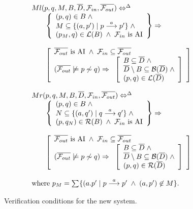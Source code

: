 \begin{figure}
\[\begin{array}{lll}
\multicolumn{3}{l}{Ml(p,q,M,B,\overline{D},{\cal F}_{in},\overline{{\cal F}_{out}}) \Leftrightarrow^{\Delta}}\\
&&\left\{
\begin{array}{l}
(p,q)\in B\;\wedge\\
M\subseteq\{(a,p')\mid p\der{a}p'\}\;\wedge\\
(p_M,q)\in{\cal L}(B)\;\wedge\;{\cal F}_{in} \mbox{ is AI}
\end{array}\right\}\Rightarrow\\
\\
&&\left[
\begin{array}{l}
\overline{{\cal F}_{out}}  \mbox{ is AI} \;\wedge\;{\cal F}_{in}\subseteq\overline{{\cal F}_{out}}\\
(\overline{{\cal F}_{out}}\not\models p\not\sim q)\Rightarrow\;\;
\left[
\begin{array}{l}
B\subseteq \overline{D}\; \wedge\\
\overline{D}\setminus B\subseteq {\cal B}(\overline{D})\;\wedge\\
(p,q)\in{\cal L}(\overline{D})
\end{array}
\right]
\end{array}
\right]\\
\\

\multicolumn{3}{l}{Mr(p,q,M,B,\overline{D},{\cal F}_{in},\overline{{\cal F}_{out}}) \Leftrightarrow^{\Delta}}\\
&&\left\{
\begin{array}{l}
(p,q)\in B\;\wedge\\
N\subseteq\{(a,q')\mid q\der{a}q'\}\;\wedge\\
(p,q_N)\in{\cal R}(B)\;\wedge\;{\cal F}_{in} \mbox{ is AI}
\end{array}\right\}\Rightarrow\\
\\
&&\left[
\begin{array}{l}
\overline{{\cal F}_{out}}  \mbox{ is AI} \;\wedge\;{\cal F}_{in}\subseteq\overline{{\cal F}_{out}}\\
(\overline{{\cal F}_{out}}\not\models p\not\sim q)\Rightarrow\;\;
\left[
\begin{array}{l}
B\subseteq \overline{D}\; \wedge\\
\overline{D}\setminus B\subseteq {\cal B}(\overline{D})\;\wedge\\
(p,q)\in{\cal R}(\overline{D})
\end{array}
\right]
\end{array}
\right]\\
\\
\multicolumn{3}{l}{\mbox{where } p_M = \sum_{}\{(a.p'\mid p\der{a}p'\;\wedge\;(a,p')\not\in M\}.}

\end{array}
\]
\endgroup
\caption{Verification conditions for the new system.\label{figNewSysVerification}}
\end{figure}

